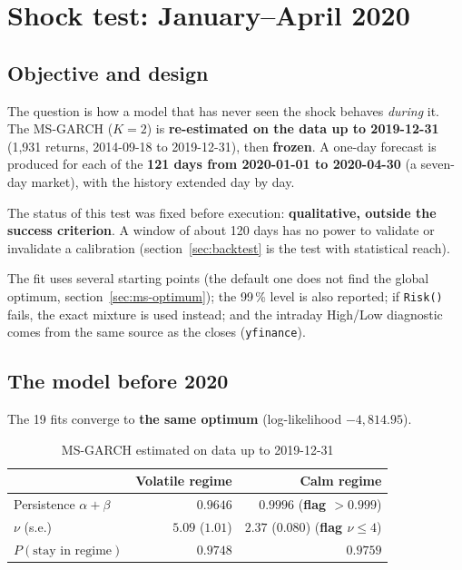 \documentclass[12pt,a4paper]{article}
\begin{document}
\section{Shock test: January--April 2020}
\label{sec:shock}

\subsection{Objective and design}

The question is how a model that has never seen the shock behaves \emph{during} it. The MS-GARCH ($K=2$) is \textbf{re-estimated on the data up to 2019-12-31} (1,931 returns, 2014-09-18 to 2019-12-31), then \textbf{frozen}. A one-day forecast is produced for each of the \textbf{121 days from 2020-01-01 to 2020-04-30} (a seven-day market), with the history extended day by day.

The status of this test was fixed before execution: \textbf{qualitative, outside the success criterion}. A window of about 120 days has no power to validate or invalidate a calibration (section~\ref{sec:backtest} is the test with statistical reach).

The fit uses several starting points (the default one does not find the global optimum, section~\ref{sec:ms-optimum}); the 99\,\% level is also reported; if \texttt{Risk()} fails, the exact mixture is used instead; and the intraday High/Low diagnostic comes from the same source as the closes (\texttt{yfinance}).

\subsection{The model before 2020}

The 19 fits converge to \textbf{the same optimum} (log-likelihood $-4{,}814.95$).

\begin{table}[H]
	\centering
	\caption{MS-GARCH estimated on data up to 2019-12-31}
	\label{tab:shock-pre2020}
	\begin{tabular}{lrr}
		\toprule
		& Volatile regime & Calm regime \\
		\midrule
		Persistence $\alpha+\beta$ & $0.9646$ & $0.9996$ (\textbf{flag $>0.999$}) \\
		$\nu$ (s.e.) & $5.09$ ($1.01$) & $2.37$ ($0.080$) (\textbf{flag $\nu\le4$}) \\
		$P(\text{stay in regime})$ & $0.9748$ & $0.9759$ \\
		\bottomrule
	\end{tabular}
\end{table}
\end{document}
